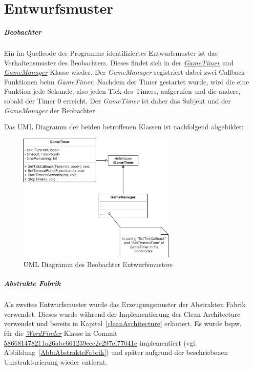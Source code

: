\chapter{Entwurfsmuster}
\paragraph{Beobachter}
Ein im Quellcode des Programms identifiziertes Entwurfsmuster ist das Verhaltensmuster des Beobachters. Dieses findet sich in der \href{https://github.com/EinToni/Wortfinder/blob/main/Wortfinder/GameTimer.cs}{\textit{GameTimer}} und \href{https://github.com/EinToni/Wortfinder/blob/main/Wortfinder/GameManager.cs}{\textit{GameManager}} Klasse wieder. Der \textit{GameManager} registriert dabei zwei Callback-Funktionen beim \textit{GameTimer}. Nachdem der Timer gestartet wurde, wird die eine Funktion jede Sekunde, also jeden Tick des Timers, aufgerufen und die andere, sobald der Timer 0 erreicht. Der \textit{GameTimer} ist daher das Subjekt und der \textit{GameManager} der Beobachter.

Das UML Diagramm der beiden betroffenen Klassen ist nachfolgend abgebildet:\\

\begin{figure}[htb]
\centering
\includegraphics[width=0.7\textwidth]{Bilder/Entwurfsmuster.PNG}
\caption{\label{Abb:Entwurfsmuster}UML Diagramm des Beobachter Entwurfsmusters}
\end{figure}

\newpage
\paragraph{Abstrakte Fabrik}
Als zweites Entwurfsmuster wurde das Erzeugungsmuster der Abstrakten Fabrik verwendet. Dieses wurde während der Implementierung der Clean Architecture verwendet und bereits in Kapitel~\ref{cleanArchitecture} erläutert. Es wurde bspw. für die \href{https://github.com/EinToni/Wortfinder/blob/main/Wortfinder/WordGenerator.cs}{\textit{WordFinder}} Klasse in Commit \href{https://github.com/EinToni/Wortfinder/commit/586681478211a26abc661239ecc2c297ef77041e}{586681478211a26abc661239ecc2c297ef77041e} implementiert (vgl. Abbildung~\ref{Abb:AbstrakteFabrik}) und später aufgrund der beschriebenen Umstrukturierung wieder entfernt.

